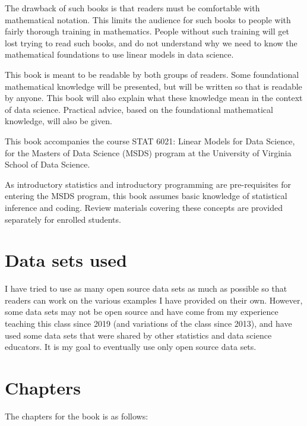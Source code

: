 \documentclass[
]{book}
\begin{document}
The drawback of such books is that readers must be comfortable with mathematical notation. This limits the audience for such books to people with fairly thorough training in mathematics. People without such training will get lost trying to read such books, and do not understand why we need to know the mathematical foundations to use linear models in data science.

This book is meant to be readable by both groups of readers. Some foundational mathematical knowledge will be presented, but will be written so that is readable by anyone. This book will also explain what these knowledge mean in the context of data science. Practical advice, based on the foundational mathematical knowledge, will also be given.

This book accompanies the course STAT 6021: Linear Models for Data Science, for the Masters of Data Science (MSDS) program at the University of Virginia School of Data Science.

As introductory statistics and introductory programming are pre-requisites for entering the MSDS program, this book assumes basic knowledge of statistical inference and coding. Review materials covering these concepts are provided separately for enrolled students.

\hypertarget{data-sets-used}{%
\section*{Data sets used}\label{data-sets-used}}

I have tried to use as many open source data sets as much as possible so that readers can work on the various examples I have provided on their own. However, some data sets may not be open source and have come from my experience teaching this class since 2019 (and variations of the class since 2013), and have used some data sets that were shared by other statistics and data science educators. It is my goal to eventually use only open source data sets.

\hypertarget{chapters}{%
\section*{Chapters}\label{chapters}}

The chapters for the book is as follows:
\end{document}
